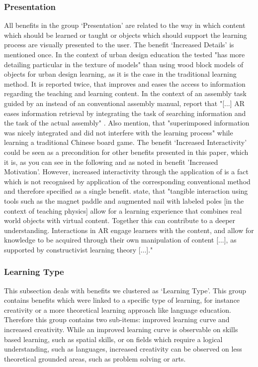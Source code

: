 \subsubsection{Presentation}
All benefits in the group ‘Presentation’ are related to the way in which content which should be learned or taught or objects which should support the learning process are visually presented to the user.  
The benefit ‘Increased Details’ is mentioned once. In the context of urban design education the tested \AR "has more detailing particular in the texture of models"\autocite[17]{Chen.2008} than using wood block models of objects for urban 
design learning, as it is the case in the traditional learning method.
It is reported twice, that \AR \apps improves and eases the access to information regarding the teaching and learning content. In the context of an assembly task guided by an \AR \app instead of an conventional 
assembly manual, \cite{Hou.2013} report that "[...] AR eases information retrieval by integrating the task of searching information and the task of the actual assembly" \autocite[447]{Hou.2013}. Also \cite{Iwata.2011}
mention, that "superimposed information was nicely integrated and did not interfere with the learning process"\autocite[112]{Iwata.2011} while learning a traditional Chinese board game.
The benefit ‘Increased Interactivity’ could be seen as a precondition for other benefits presented in this paper, which it is, as you can see in the following and as noted in benefit 'Increased Motivation'. However, increased interactivity through the application of \AR is a 
fact which is not recognised by application of the corresponding conventional method\autocite[cf.][113]{Dunser.2012}\mulcit\autocite[cf.][11]{Ibanez.2014} and therefore specified as a single benefit.
\cite{Dunser.2012} state, that "tangible interaction using tools such as the magnet paddle and augmented nail with labeled poles [in the context of teaching physics] allow for a learning experience that combines real world objects with virtual content. 
Together this can contribute to a deeper understanding. Interactions in AR engage learners with the content, and allow for knowledge to be acquired through their own manipulation of content [...], 
as supported by constructivist learning theory [...]."

% 
\subsubsection{Learning Type}
This subsection deals with benefits we clustered as ‘Learning Type’. This group contains benefits which were linked to a specific type of learning, for instance creativity or a more theoretical learning approach like language education. \\
Therefore this group contains two sub-items: improved learning curve and increased creativity. While an improved learning curve is observable on skills based learning, such as spatial skills, or on fields which require a logical understanding, such as languages, increased creativity can be observed on less theoretical grounded areas, such as problem solving or arts.

